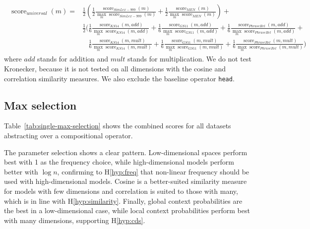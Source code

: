 {\scriptsize
\begin{align}
  \begin{split}
\operatorname{score}_\mathit{universal}(\mathit{m}) = &%
\frac{1}{2}\left(
\frac{1}{2}%
\frac{\operatorname{score}_\mathit{SimLex-999}(\mathit{m})}%
{\max_m\operatorname{score}_\mathit{SimLex-999}(m)}%
+%
\frac{1}{2}%
\frac{\operatorname{score}_\mathit{MEN}(\mathit{m})}%
{\max_m\operatorname{score}_\mathit{MEN}(m)}%
\right)+
\\
&\frac{1}{2}\Bigg(
\frac{1}{6}%
\frac{\operatorname{score}_\mathit{KS14}(\mathit{m}, \mathit{add})}%
{\max_m\operatorname{score}_\mathit{KS14}(m, \mathit{add})}%
+%
\frac{1}{6}%
\frac{\operatorname{score}_\mathit{GS11}(\mathit{m}, \mathit{add})}%
{\max_m\operatorname{score}_\mathit{GS11}(m, \mathit{add})}%
+%
\frac{1}{6}%
\frac{\operatorname{score}_\mathit{PhraseRel}(\mathit{m, \mathit{add}})}%
{\max_m\operatorname{score}_\mathit{PhraseRel}(m, \mathit{add})}
+
\\
&\phantom{\frac{1}{2}\Bigg(}
\frac{1}{6}%
\frac{\operatorname{score}_\mathit{KS14}(\mathit{m}, \mathit{mult})}%
{\max_m\operatorname{score}_\mathit{KS14}(m, \mathit{mult})}%
+%
\frac{1}{6}%
\frac{\operatorname{score}_\mathit{GS11}(\mathit{m}, \mathit{mult})}%
{\max_m\operatorname{score}_\mathit{GS11}(m, \mathit{mult})}%
+%
\frac{1}{6}%
\frac{\operatorname{score}_\mathit{PhraseRel}(\mathit{m, \mathit{mult}})}%
{\max_m\operatorname{score}_\mathit{PhraseRel}(m, \mathit{mult})}
\Bigg)
\end{split}
\end{align}
\normalsize
}
where $\mathit{add}$ stands for addition and $\mathit{mult}$ stands for multiplication. We do not test Kronecker, because it is not tested on all dimensions with the cosine and correlation similarity measures. We also exclude the baseline operator \texttt{head}.

\subsection{Max selection}
\label{sec:max-selection-single}

Table~\ref{tab:single-max-selection} shows the combined scores for all datasets abstracting over a compositional operator.

The parameter selection shows a clear pattern. Low-dimensional spaces perform best with 1 as the frequency choice, while high-dimensional models perform better with $\log n$, confirming to H\ref{hyp:freq} that non-linear frequency should be used with high-dimensional models. Cosine is a better-suited similarity measure for models with few dimensions and correlation is suited to those with many, which is in line with H\ref{hyp:similarity}. Finally, global context probabilities are the best in a low-dimensional case, while local context probabilities perform best with many dimensions, supporting H\ref{hyp:cds}.

